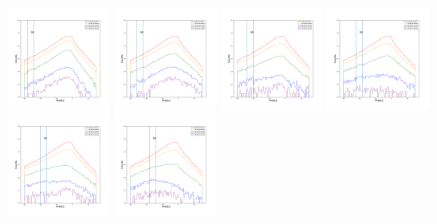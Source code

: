 \documentclass[12pt,prd]{article}
\begin{document}
\begin{figure}[h!]
\centering
\includegraphics[width=0.24\textwidth]{../figures/scanning_plotsgaiascan_l315_0_b66_4_ra197_7_dec4_0_npy_0.pdf}
\includegraphics[width=0.24\textwidth]{../figures/scanning_plotsgaiascan_l315_0_b66_4_ra197_7_dec4_0_npy_1.pdf}
\includegraphics[width=0.24\textwidth]{../figures/scanning_plotsgaiascan_l315_0_b66_4_ra197_7_dec4_0_npy_2.pdf}
\includegraphics[width=0.24\textwidth]{../figures/scanning_plotsgaiascan_l315_0_b66_4_ra197_7_dec4_0_npy_3.pdf}
\includegraphics[width=0.24\textwidth]{../figures/scanning_plotsgaiascan_l315_0_b66_4_ra197_7_dec4_0_npy_4.pdf}
\includegraphics[width=0.24\textwidth]{../figures/scanning_plotsgaiascan_l315_0_b66_4_ra197_7_dec4_0_npy_5.pdf}

\end{figure}
\end{document}
